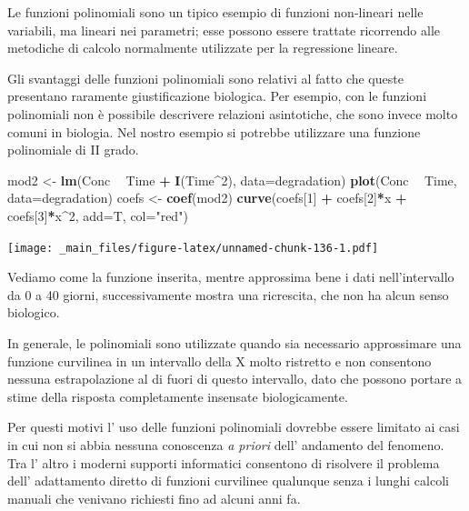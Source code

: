 \documentclass[a4paper,12pt,oneside]{book}
\newenvironment{Shaded}{\begin{snugshade}}{\end{snugshade}}
\newcommand{\KeywordTok}[1]{\textcolor[rgb]{0.13,0.29,0.53}{\textbf{#1}}}
\newcommand{\DataTypeTok}[1]{\textcolor[rgb]{0.13,0.29,0.53}{#1}}
\newcommand{\DecValTok}[1]{\textcolor[rgb]{0.00,0.00,0.81}{#1}}
\newcommand{\StringTok}[1]{\textcolor[rgb]{0.31,0.60,0.02}{#1}}
\newcommand{\OperatorTok}[1]{\textcolor[rgb]{0.81,0.36,0.00}{\textbf{#1}}}
\newcommand{\NormalTok}[1]{#1}
\theoremstyle{definition}
\theoremstyle{definition}
\theoremstyle{definition}
\theoremstyle{remark}
\begin{document}
Le funzioni polinomiali sono un tipico esempio di funzioni non-lineari
nelle variabili, ma lineari nei parametri; esse possono essere trattate
ricorrendo alle metodiche di calcolo normalmente utilizzate per la
regressione lineare.

Gli svantaggi delle funzioni polinomiali sono relativi al fatto che
queste presentano raramente giustificazione biologica. Per esempio, con
le funzioni polinomiali non è possibile descrivere relazioni
asintotiche, che sono invece molto comuni in biologia. Nel nostro
esempio si potrebbe utilizzare una funzione polinomiale di II grado.

\begin{Shaded}
\begin{Highlighting}[]
\NormalTok{mod2 <-}\StringTok{ }\KeywordTok{lm}\NormalTok{(Conc }\OperatorTok{~}\StringTok{ }\NormalTok{Time }\OperatorTok{+}\StringTok{ }\KeywordTok{I}\NormalTok{(Time}\OperatorTok{^}\DecValTok{2}\NormalTok{), }\DataTypeTok{data=}\NormalTok{degradation)}
\KeywordTok{plot}\NormalTok{(Conc }\OperatorTok{~}\StringTok{ }\NormalTok{Time, }\DataTypeTok{data=}\NormalTok{degradation)}
\NormalTok{coefs <-}\StringTok{ }\KeywordTok{coef}\NormalTok{(mod2)}
\KeywordTok{curve}\NormalTok{(coefs[}\DecValTok{1}\NormalTok{] }\OperatorTok{+}\StringTok{ }\NormalTok{coefs[}\DecValTok{2}\NormalTok{]}\OperatorTok{*}\NormalTok{x }\OperatorTok{+}\StringTok{ }\NormalTok{coefs[}\DecValTok{3}\NormalTok{]}\OperatorTok{*}\NormalTok{x}\OperatorTok{^}\DecValTok{2}\NormalTok{, }\DataTypeTok{add=}\NormalTok{T, }\DataTypeTok{col=}\StringTok{"red"}\NormalTok{)}
\end{Highlighting}
\end{Shaded}

\texttt{[image: \_main\_files/figure-latex/unnamed-chunk-136-1.pdf]}

Vediamo come la funzione inserita, mentre approssima bene i dati
nell'intervallo da 0 a 40 giorni, successivamente mostra una ricrescita,
che non ha alcun senso biologico.

In generale, le polinomiali sono utilizzate quando sia necessario
approssimare una funzione curvilinea in un intervallo della X molto
ristretto e non consentono nessuna estrapolazione al di fuori di questo
intervallo, dato che possono portare a stime della risposta
completamente insensate biologicamente.

Per questi motivi l' uso delle funzioni polinomiali dovrebbe essere
limitato ai casi in cui non si abbia nessuna conoscenza \emph{a priori}
dell' andamento del fenomeno. Tra l' altro i moderni supporti
informatici consentono di risolvere il problema dell' adattamento
diretto di funzioni curvilinee qualunque senza i lunghi calcoli manuali
che venivano richiesti fino ad alcuni anni fa.
\end{document}
